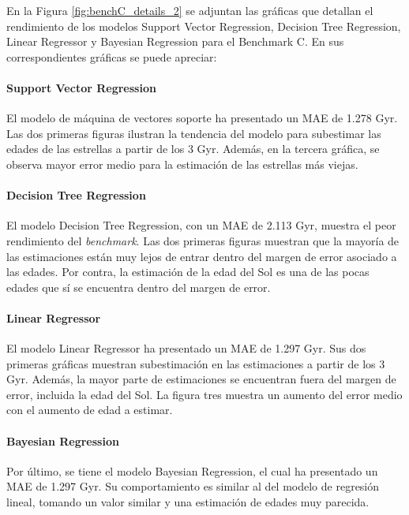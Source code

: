 En la Figura \ref{fig:benchC_details_2} se adjuntan las gráficas que detallan el rendimiento de los modelos Support Vector Regression, Decision Tree Regression, Linear Regressor y Bayesian Regression para el Benchmark C. En sus correspondientes gráficas se puede apreciar:

\paragraph{Support Vector Regression} 
El modelo de máquina de vectores soporte ha presentado un MAE de 1.278 Gyr. Las dos primeras figuras ilustran la tendencia del modelo para subestimar las edades de las estrellas a partir de los 3 Gyr. Además, en la tercera gráfica, se observa mayor error medio para la estimación de las estrellas más viejas.

\paragraph{Decision Tree Regression} 
El modelo Decision Tree Regression, con un MAE de 2.113 Gyr, muestra el peor rendimiento del \emph{benchmark}. Las dos primeras figuras muestran que la mayoría de las estimaciones están muy lejos de entrar dentro del margen de error asociado a las edades. Por contra, la estimación de la edad del Sol es una de las pocas edades que sí se encuentra dentro del margen de error.

\paragraph{Linear Regressor} 
El modelo Linear Regressor ha presentado un MAE de 1.297 Gyr. Sus dos primeras gráficas muestran subestimación en las estimaciones a partir de los 3 Gyr. Además, la mayor parte de estimaciones se encuentran fuera del margen de error, incluida la edad del Sol. La figura tres muestra un aumento del error medio con el aumento de edad a estimar.


\paragraph{Bayesian Regression} 
Por último, se tiene el modelo Bayesian Regression, el cual ha presentado un MAE de 1.297 Gyr. Su comportamiento es similar al del modelo de regresión lineal, tomando un valor similar y una estimación de edades muy parecida.

